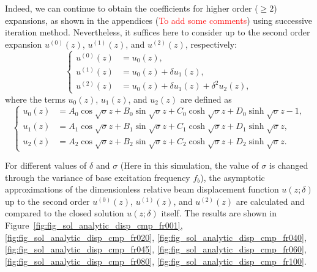 \documentclass{article}
\begin{document}
Indeed, we can continue to obtain the coefficients for higher order ($\geq 2$) expansions, as shown in the appendices (\textcolor{red}{To add some comments}) using successive iteration method. Nevertheless, it suffices here to consider up to the second order expansion $u^{(0)} (z)$, $u^{(1)} (z)$, and $u^{(2)} (z)$, respectively:
\begin{equation}
    \left\{\begin{aligned}
        u^{(0)} (z) &= u_0 (z), \\
        u^{(1)} (z) &= u_0 (z) + \delta u_1(z), \\
        u^{(2)} (z) &= u_0 (z) + \delta u_1(z) + \delta^2 u_2 (z),
    \end{aligned}\right.
\end{equation}
where the terms $u_0 (z)$, $u_1(z)$, and $u_2 (z)$ are defined as
\begin{equation}
    \left\{\begin{aligned}
        u_0 (z) &= A_0 \cos{\sqrt{\sigma}z} + B_0 \sin{\sqrt{\sigma}z} + C_0 \cosh{\sqrt{\sigma}z} + D_0 \sinh{\sqrt{\sigma}z} - 1, \\
        u_1 (z) &= A_1 \cos{\sqrt{\sigma}z} + B_1 \sin{\sqrt{\sigma}z} + C_1 \cosh{\sqrt{\sigma}z} + D_1 \sinh{\sqrt{\sigma}z}, \\
        u_2 (z) &= A_2 \cos{\sqrt{\sigma}z} + B_2 \sin{\sqrt{\sigma}z} + C_2 \cosh{\sqrt{\sigma}z} + D_2 \sinh{\sqrt{\sigma}z}.
    \end{aligned}\right.
\end{equation}


For different values of $\delta$ and $\sigma$ (Here in this simulation, the value of $\sigma$ is changed through the variance of base excitation frequency $f_b$), the asymptotic approximations of the dimensionless relative beam displacement function $u(z;\delta)$ up to the second order $u^{(0)}(z)$, $u^{(1)}(z)$, and $u^{(2)}(z)$ are calculated and compared to the closed solution $u(z;\delta)$ itself. The results are shown in Figure~\ref{fig:fig_sol_analytic_disp_cmp_fr001}, \ref{fig:fig_sol_analytic_disp_cmp_fr020}, \ref{fig:fig_sol_analytic_disp_cmp_fr040}, \ref{fig:fig_sol_analytic_disp_cmp_fr045}, \ref{fig:fig_sol_analytic_disp_cmp_fr060}, \ref{fig:fig_sol_analytic_disp_cmp_fr080}, \ref{fig:fig_sol_analytic_disp_cmp_fr100}. 
\end{document}
